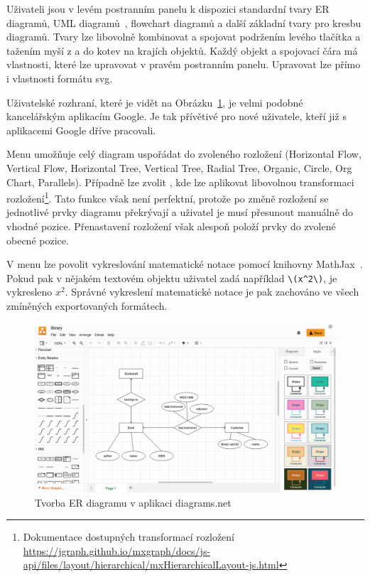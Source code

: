 Uživateli jsou v levém postranním panelu k dispozici standardní tvary ER diagramů, UML diagramů~\cite{omg_uml_2017}, flowchart diagramů a další základní tvary pro kresbu diagramů.
Tvary lze libovolně kombinovat a spojovat podržením levého tlačítka a tažením myší z a do kotev na krajích objektů.
Každý objekt a spojovací čára má vlastnosti, které lze upravovat v pravém postranním panelu.
Upravovat lze přímo i vlastnosti formátu \acrshort{svg}.

Uživatelské rozhraní, které je vidět na Obrázku~\ref{fig:diagrams.net}, je velmi podobné kancelářským aplikacím Google.
Je tak přívětivé pro nové uživatele, kteří již s aplikacemi Google dříve pracovali.

Menu  umožňuje celý diagram uspořádat do zvoleného rozložení (Horizontal Flow, Vertical Flow, Horizontal Tree, Vertical Tree, Radial Tree, Organic, Circle, Org Chart, Parallels).
Případně lze zvolit , kde lze aplikovat libovolnou transformaci rozložení\footnote{Dokumentace dostupných transformací rozložení \url{https://jgraph.github.io/mxgraph/docs/js-api/files/layout/hierarchical/mxHierarchicalLayout-js.html}}.
Tato funkce však není perfektní, protože po změně rozložení se jednotlivé prvky diagramu překrývají a uživatel je musí přesunout manuálně do vhodné pozice.
Přenastavení rozložení však alespoň položí prvky do zvolené obecné pozice.

V menu  lze povolit vykreslování matematické notace pomocí knihovny MathJax~\cite{mathjaxconsortium_mathjax_}.
Pokud pak v nějakém textovém objektu uživatel zadá například \verb|\(x^2\)|, je vykresleno $x^2$.
Správné vykreslení matematické notace je pak zachováno ve všech zmíněných exportovaných formátech.

\begin{figure}[!htb]
  \centering
  \includegraphics[width = \maxwidth{\textwidth}]{../img/diagrams.net.png}
  \caption{Tvorba ER diagramu v aplikaci diagrams.net}
  \label{fig:diagrams.net}
\end{figure}

